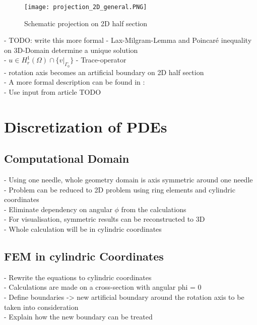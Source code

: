 \documentclass[parskip=half, titlepage=yes, 12pt, BCOR=12mm, DIV=calc]{scrartcl}
\begin{document}
\begin{figure}[H]
    \centering
    \texttt{[image: projection\_2D\_general.PNG]}
    \caption{Schematic projection on 2D half section}
    \label{projection_2D_general}
\end{figure}


- TODO: write this more formal
- Lax-Milgram-Lemma and Poincaré inequality on 3D-Domain determine a unique solution \\
- $u \in H^{1}_{r}(\Omega) \cap \{ v|_{\Gamma_{0}} \}  $
- Trace-operator \\
- rotation axis becomes an artificial boundary on 2D half section \\

- A more formal description can be found in : \\
- Use input from article TODO \\


\section{Discretization of PDEs}

\subsection{Computational Domain}
- Using one needle, whole geometry domain is axis symmetric around one needle \\
- Problem can be reduced to 2D problem using ring elements and cylindric coordinates \\
- Eliminate dependency on angular $\phi$ from the calculations \\
- For visualisation, symmetric results can be reconstructed to 3D \\
- Whole calculation will be in cylindric coordinates \\

\subsection{FEM in cylindric Coordinates}
- Rewrite the equations to cylindric coordinates \\
- Calculations are made on a cross-section with angular phi = 0 \\
- Define boundaries -> new artificial boundary around the rotation axis to be taken into consideration \\
- Explain how the new boundary can be treated \\
 
\end{document}
